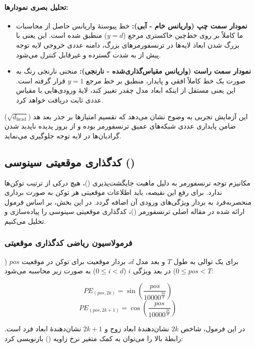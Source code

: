 \documentclass{article}
\begin{document}
\paragraph{تحلیل بصری نمودارها:}
\begin{itemize}
	\item \textbf{نمودار سمت چپ (واریانس خام - آبی):} خط پیوستهٔ واریانس حاصل از محاسبات ما کاملاً بر روی خط‌چین خاکستری مرجع ($y = d$) منطبق شده است. این یعنی با بزرگ شدن ابعاد لایه‌ها در ترنسفورمرهای بزرگ، دامنه عددی خروجی لایه توجه پیش از  به شدت گسترده و غیرقابل کنترل می‌شود.
	\item \textbf{نمودار سمت راست (واریانس مقیاس‌گذاری‌شده - نارنجی):} منحنی نارنجی رنگ به صورت یک خط کاملاً افقی و پایدار، منطبق بر خط مرجع $y = 1$ قرار گرفته است. این یعنی مستقل از اینکه ابعاد مدل چقدر تغییر کند، لایهٔ  ورودی‌هایی با مقیاس عددی ثابت دریافت خواهد کرد.
\end{itemize}

این آزمایش تجربی به وضوح نشان می‌دهد که تقسیم امتیازها بر جذر بعد هد ($\sqrt{d_{\mathrm{head}}}$) ضامن پایداری عددی شبکه‌های عمیق ترنسفورمر بوده و از بروز پدیده ناپدید شدن گرادیان‌ها در لایه توجه جلوگیری می‌نماید.

\subsection{کدگذاری موقعیتی سینوسی ()}

مکانیزم توجه ترنسفورمر به دلیل ماهیت جایگشت‌پذیری ()، هیچ درکی از ترتیب توکن‌ها ندارد. برای رفع این نقیصه، باید اطلاعات موقعیتی هر توکن به صورت برداری منحصر‌به‌فرد به بردار ویژگی‌های ورودی آن اضافه گردد. در این بخش، بر اساس فرمول ارائه شده در مقاله اصلی ترنسفورمر ()، کدگذاری موقعیتی سینوسی را پیاده‌سازی و تحلیل می‌کنیم.

\subsubsection*{فرمولاسیون ریاضی کدگذاری موقعیتی}

برای یک توالی به طول $T$ و بعد مدل $d$، بردار موقعیت برای توکن در موقعیت $pos$ ($0 \le pos < T$) در بعد ویژگی $i$ ($0 \le i < d$) به صورت زیر محاسبه می‌شود:

\[
PE_{(pos, 2k)} = \sin\left(\frac{pos}{10000^{\frac{2k}{d}}}\right)
\]
\[
PE_{(pos, 2k+1)} = \cos\left(\frac{pos}{10000^{\frac{2k}{d}}}\right)
\]

در این فرمول، شاخص $2k$ نشان‌دهندۀ ابعاد زوج و $2k+1$ نشان‌دهندۀ ابعاد فرد است. رابطۀ بالا را می‌توان به کمک متغیر نرخ زاویه () بازنویسی کرد:
\end{document}

